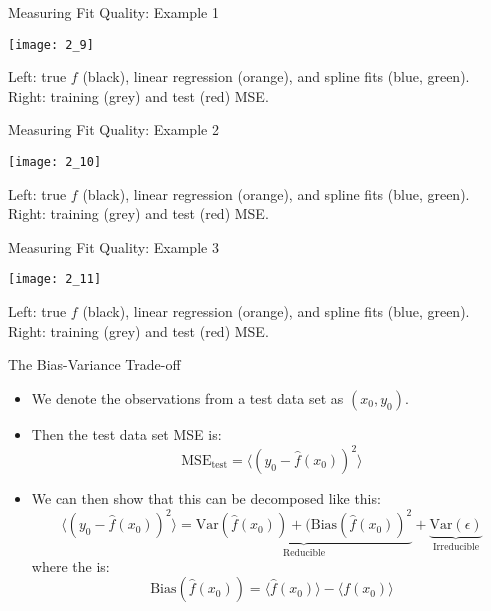 \documentclass[mathserif, aspectratio=169]{beamer}
\begin{document}
\begin{frame}{Measuring Fit Quality: Example 1}
	\vspace{-5mm}
	\begin{center}
		\texttt{[image: 2\_9]}

		Left: true $f$ (black), linear regression (orange), and spline fits (blue, green).\\
		Right: training (grey) and test (red) MSE.
	\end{center}
\end{frame}

\begin{frame}{Measuring Fit Quality: Example 2}
	\vspace{-5mm}
	\begin{center}
		\texttt{[image: 2\_10]}

		Left: true $f$ (black), linear regression (orange), and spline fits (blue, green).\\
		Right: training (grey) and test (red) MSE.
	\end{center}
\end{frame}

\begin{frame}{Measuring Fit Quality: Example 3}
	\vspace{-5mm}
	\begin{center}
		\texttt{[image: 2\_11]}

		Left: true $f$ (black), linear regression (orange), and spline fits (blue, green).\\
		Right: training (grey) and test (red) MSE.
	\end{center}
\end{frame}

\begin{frame}{The Bias-Variance Trade-off}
	\begin{itemize}
		\item We denote the observations from a test data set as $(x_0, y_0)$.
		\item Then the test data set MSE is:
			\[ \text{MSE}_\text{test} = \langle (y_0 - \hat{f}(x_0))^2 \rangle \]
		\item We can then show that this can be decomposed like this:
			\[ 
			\langle (y_0 - \hat{f}(x_0))^2 \rangle
			= \underbrace{\text{Var}(\hat{f}(x_0)) + (\text{Bias}(\hat{f}(x_0))^2}_\text{Reducible} 
			+ \underbrace{\text{Var}(\epsilon)}_\text{Irreducible}
			\]
			where the  is:
			\[ \text{Bias}(\hat{f}(x_0)) = \langle\hat{f}(x_0)\rangle - \langle f(x_0)\rangle\] 
	\end{itemize}
\end{frame}
\end{document}
